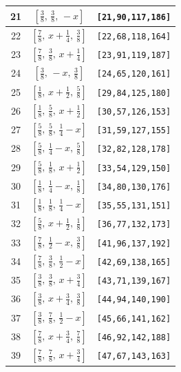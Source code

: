 \documentclass[fleqn,8pt]{jsarticle}
\begin{document}
\begin{longtable}{ccc}
21 & $\left[ \frac{3}{8},\, \frac{3}{8},\, - x \right]$ & {\tt [21,90,117,186]} \\ \hline
22 & $\left[ \frac{7}{8},\, x + \frac{1}{4},\, \frac{3}{8} \right]$ & {\tt [22,68,118,164]} \\ \hline
23 & $\left[ \frac{7}{8},\, \frac{3}{8},\, x + \frac{1}{4} \right]$ & {\tt [23,91,119,187]} \\ \hline
24 & $\left[ \frac{3}{8},\, - x,\, \frac{3}{8} \right]$ & {\tt [24,65,120,161]} \\ \hline
25 & $\left[ \frac{1}{8},\, x + \frac{1}{2},\, \frac{5}{8} \right]$ & {\tt [29,84,125,180]} \\ \hline
26 & $\left[ \frac{1}{8},\, \frac{5}{8},\, x + \frac{1}{2} \right]$ & {\tt [30,57,126,153]} \\ \hline
27 & $\left[ \frac{5}{8},\, \frac{5}{8},\, \frac{1}{4} - x \right]$ & {\tt [31,59,127,155]} \\ \hline
28 & $\left[ \frac{5}{8},\, \frac{1}{4} - x,\, \frac{5}{8} \right]$ & {\tt [32,82,128,178]} \\ \hline
29 & $\left[ \frac{5}{8},\, \frac{1}{8},\, x + \frac{1}{2} \right]$ & {\tt [33,54,129,150]} \\ \hline
30 & $\left[ \frac{1}{8},\, \frac{1}{4} - x,\, \frac{1}{8} \right]$ & {\tt [34,80,130,176]} \\ \hline
31 & $\left[ \frac{1}{8},\, \frac{1}{8},\, \frac{1}{4} - x \right]$ & {\tt [35,55,131,151]} \\ \hline
32 & $\left[ \frac{5}{8},\, x + \frac{1}{2},\, \frac{1}{8} \right]$ & {\tt [36,77,132,173]} \\ \hline
33 & $\left[ \frac{7}{8},\, \frac{1}{2} - x,\, \frac{3}{8} \right]$ & {\tt [41,96,137,192]} \\ \hline
34 & $\left[ \frac{7}{8},\, \frac{3}{8},\, \frac{1}{2} - x \right]$ & {\tt [42,69,138,165]} \\ \hline
35 & $\left[ \frac{3}{8},\, \frac{3}{8},\, x + \frac{3}{4} \right]$ & {\tt [43,71,139,167]} \\ \hline
36 & $\left[ \frac{3}{8},\, x + \frac{3}{4},\, \frac{3}{8} \right]$ & {\tt [44,94,140,190]} \\ \hline
37 & $\left[ \frac{3}{8},\, \frac{7}{8},\, \frac{1}{2} - x \right]$ & {\tt [45,66,141,162]} \\ \hline
38 & $\left[ \frac{7}{8},\, x + \frac{3}{4},\, \frac{7}{8} \right]$ & {\tt [46,92,142,188]} \\ \hline
39 & $\left[ \frac{7}{8},\, \frac{7}{8},\, x + \frac{3}{4} \right]$ & {\tt [47,67,143,163]} \\ \hline

\end{longtable}
\end{document}
